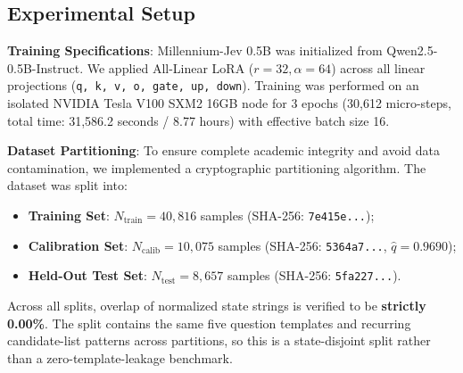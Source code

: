 \documentclass[11pt,a4paper]{article}
\begin{document}
\subsection{Experimental Setup}
\textbf{Training Specifications}: Millennium-Jev 0.5B was initialized from Qwen2.5-0.5B-Instruct. We applied All-Linear LoRA ($r=32, \alpha=64$) across all linear projections (\texttt{q, k, v, o, gate, up, down}). Training was performed on an isolated NVIDIA Tesla V100 SXM2 16GB node for 3 epochs (30,612 micro-steps, total time: 31,586.2 seconds / 8.77 hours) with effective batch size 16.

\textbf{Dataset Partitioning}: To ensure complete academic integrity and avoid data contamination, we implemented a cryptographic partitioning algorithm. The dataset was split into:
\begin{itemize}
    \item \textbf{Training Set}: $N_{\text{train}} = 40,816$ samples (SHA-256: \texttt{7e415e...});
    \item \textbf{Calibration Set}: $N_{\text{calib}} = 10,075$ samples (SHA-256: \texttt{5364a7...}, $\hat{q} = 0.9690$);
    \item \textbf{Held-Out Test Set}: $N_{\text{test}} = 8,657$ samples (SHA-256: \texttt{5fa227...}).
\end{itemize}
Across all splits, overlap of normalized state strings is verified to be \textbf{strictly 0.00\%}. The split contains the same five question templates and recurring candidate-list patterns across partitions, so this is a state-disjoint split rather than a zero-template-leakage benchmark.
\end{document}
